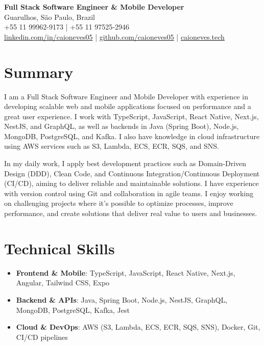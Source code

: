 \documentclass[11pt,letterpaper]{article}
\begin{document}
\begin{center}
    \textbf{\Large Full Stack Software Engineer \& Mobile Developer} \\
    \vspace{5pt}
    Guarulhos, São Paulo, Brazil \\
    +55 11 99962-9173 | +55 11 97525-2946 \\
    \href{https://www.linkedin.com/in/caioneves05}{linkedin.com/in/caioneves05} |
    \href{https://github.com/caioneves05}{github.com/caioneves05} |
    \href{http://caioneves.tech}{caioneves.tech}
\end{center}

\section{Summary}
I am a Full Stack Software Engineer and Mobile Developer with experience in developing scalable web and mobile applications focused on performance and a great user experience. I work with TypeScript, JavaScript, React Native, Next.js, NestJS, and GraphQL, as well as backends in Java (Spring Boot), Node.js, MongoDB, PostgreSQL, and Kafka. I also have knowledge in cloud infrastructure using AWS services such as S3, Lambda, ECS, ECR, SQS, and SNS.

In my daily work, I apply best development practices such as Domain-Driven Design (DDD), Clean Code, and Continuous Integration/Continuous Deployment (CI/CD), aiming to deliver reliable and maintainable solutions. I have experience with version control using Git and collaboration in agile teams. I enjoy working on challenging projects where it’s possible to optimize processes, improve performance, and create solutions that deliver real value to users and businesses.

\section{Technical Skills}
\begin{itemize}[leftmargin=*]
    \item \textbf{Frontend \& Mobile}: TypeScript, JavaScript, React Native, Next.js, Angular, Tailwind CSS, Expo
    \item \textbf{Backend \& APIs}: Java, Spring Boot, Node.js, NestJS, GraphQL, MongoDB, PostgreSQL, Kafka, Jest
    \item \textbf{Cloud \& DevOps}: AWS (S3, Lambda, ECS, ECR, SQS, SNS), Docker, Git, CI/CD pipelines
\end{itemize}
\end{document}
